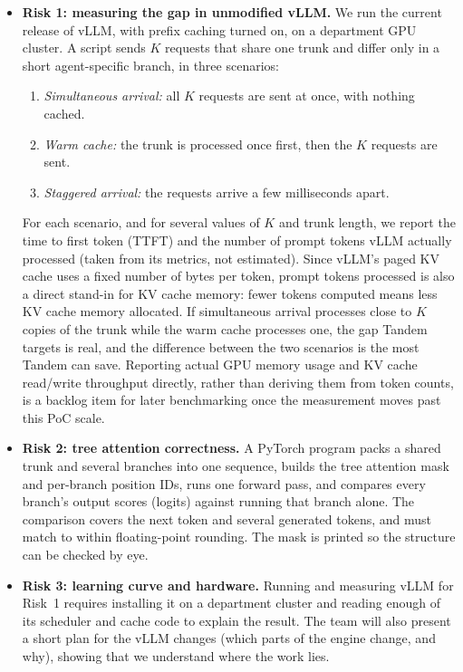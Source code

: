 \documentclass{article}
\begin{document}
\begin{itemize}
  \item \textbf{Risk 1: measuring the gap in unmodified vLLM.} We run the
  current release of vLLM, with prefix caching turned on, on a department
  GPU cluster. A script sends $K$ requests that share one trunk and differ
  only in a short agent-specific branch, in three scenarios:
  \begin{enumerate}[noitemsep]
    \item \emph{Simultaneous arrival:} all $K$ requests are sent at once,
    with nothing cached.
    \item \emph{Warm cache:} the trunk is processed once first, then the
    $K$ requests are sent.
    \item \emph{Staggered arrival:} the requests arrive a few milliseconds
    apart.
  \end{enumerate}
  For each scenario, and for several values of $K$ and trunk length, we
  report the time to first token (TTFT) and the number of prompt tokens
  vLLM actually processed (taken from its metrics, not estimated). Since
  vLLM's paged KV cache uses a fixed number of bytes per token, prompt
  tokens processed is also a direct stand-in for KV cache memory: fewer
  tokens computed means less KV cache memory allocated. If simultaneous
  arrival processes close to $K$ copies of the trunk while the warm cache
  processes one, the gap Tandem targets is real, and the difference
  between the two scenarios is the most Tandem can save. Reporting actual
  GPU memory usage and KV cache read/write throughput directly, rather
  than deriving them from token counts, is a backlog item for later
  benchmarking once the measurement moves past this PoC scale.
  \item \textbf{Risk 2: tree attention correctness.} A PyTorch program
  packs a shared trunk and several branches into one sequence, builds the
  tree attention mask and per-branch position IDs, runs one forward pass,
  and compares every branch's output scores (logits) against running that
  branch alone. The comparison covers the next token and several generated
  tokens, and must match to within floating-point rounding. The mask is
  printed so the structure can be checked by eye.
  \item \textbf{Risk 3: learning curve and hardware.} Running and measuring
  vLLM for Risk~1 requires installing it on a department cluster and
  reading enough of its scheduler and cache code to explain the result.
  The team will also present a short plan for the vLLM changes (which
  parts of the engine change, and why), showing that we understand where
  the work lies.
\end{itemize}
\end{document}

